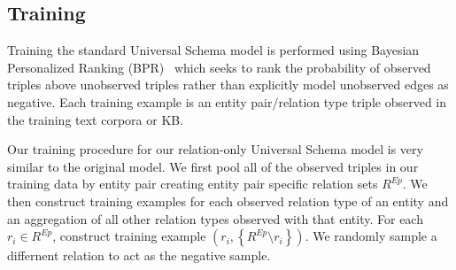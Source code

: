 \subsection {Training}
Training the standard Universal Schema model is performed using Bayesian Personalized Ranking (BPR)~\citep{rendle2009bpr} which seeks to rank the probability of observed triples above unobserved triples rather than explicitly model unobserved edges as negative.
Each training example is an entity pair/relation type triple observed in the training text corpora or KB.

Our training procedure for our relation-only Universal Schema model is very similar to the original model.
We first pool all of the observed triples in our training data by entity pair creating entity pair specific relation sets $R^{Ep}$.
We then construct training examples for each observed relation type of an entity and an aggregation of all other relation types observed with that entity.
For each $r_i \in R^{Ep}$, construct training example $(r_i, \left\{R^{Ep}\setminus r_i\right\})$.
We randomly sample a differnent relation to act as the negative sample.
